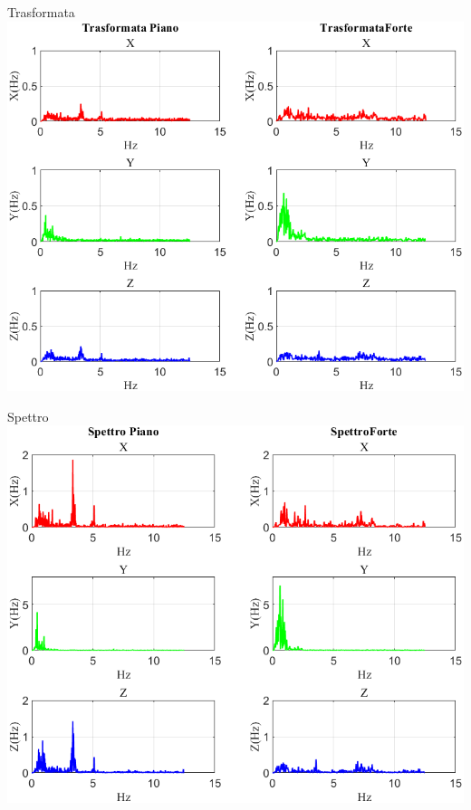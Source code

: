 \documentclass[beamer]{standalone}
\begin{document}
	
	\begin{frame}{{Trasformata}}
		\centering\includegraphics[height=.8\textheight]{figure/Mag/Trasformata/Trasformata}
	\end{frame}
	
	\begin{frame}{{Spettro}}
		\centering\includegraphics[height=.8\textheight]{figure/Mag/Trasformata/Spettro}
	\end{frame}
	
\end{document}
